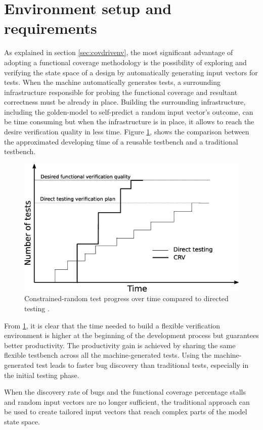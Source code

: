\section{Environment setup and requirements}
As explained in section \ref{sec:covdrivenv}, the most significant advantage of
adopting a functional coverage methodology is the possibility of exploring and
verifying the state space of a design by automatically generating input vectors
for tests. When the machine automatically generates tests, a surrounding
infrastructure responsible for probing the functional coverage and resultant
correctness must be already in place. Building the surrounding infrastructure,
including the golden-model to self-predict a random input vector's outcome, can
be time consuming \cite{spear2008systemverilog} but when the infrastructure is
in place, it allows to reach the desire verification quality in less time.
Figure \ref{fig:crv:comdirectrandom}, shows the comparison between the
approximated developing time of a reusable testbench and a traditional
testbench.

\begin{figure}[htbp]
\centering
\includegraphics[width=0.6\linewidth]{pictures/Quality_testing.eps}
\caption{Constrained-random test progress over time compared to directed testing \cite{spear2008systemverilog}.}
\label{fig:crv:comdirectrandom}
\end{figure}

From \ref{fig:crv:comdirectrandom}, it is clear that the time needed to build a
flexible verification environment is higher at the beginning of the development
process but guarantees better productivity. The productivity gain is achieved by
sharing the same flexible testbench across all the machine-generated tests.
Using the machine-generated test leads to faster bug discovery than traditional
tests, especially in the initial testing phase.

When the discovery rate of bugs and the functional coverage percentage stalls
and random input vectors are no longer sufficient, the traditional approach can
be used to create tailored input vectors that reach complex parts of the model
state space.

